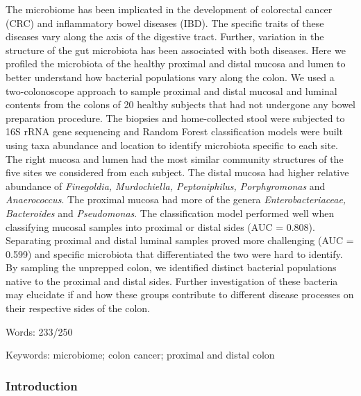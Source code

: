 \documentclass[12pt,]{article}
\begin{document}
The microbiome has been implicated in the development of colorectal
cancer (CRC) and inflammatory bowel diseases (IBD). The specific traits
of these diseases vary along the axis of the digestive tract. Further,
variation in the structure of the gut microbiota has been associated
with both diseases. Here we profiled the microbiota of the healthy
proximal and distal mucosa and lumen to better understand how bacterial
populations vary along the colon. We used a two-colonoscope approach to
sample proximal and distal mucosal and luminal contents from the colons
of 20 healthy subjects that had not undergone any bowel preparation
procedure. The biopsies and home-collected stool were subjected to 16S
rRNA gene sequencing and Random Forest classification models were built
using taxa abundance and location to identify microbiota specific to
each site. The right mucosa and lumen had the most similar community
structures of the five sites we considered from each subject. The distal
mucosa had higher relative abundance of \emph{Finegoldia, Murdochiella,
Peptoniphilus, Porphyromonas} and \emph{Anaerococcus}. The proximal
mucosa had more of the genera \emph{Enterobacteriaceae, Bacteroides} and
\emph{Pseudomonas}. The classification model performed well when
classifying mucosal samples into proximal or distal sides (AUC = 0.808).
Separating proximal and distal luminal samples proved more challenging
(AUC = 0.599) and specific microbiota that differentiated the two were
hard to identify. By sampling the unprepped colon, we identified
distinct bacterial populations native to the proximal and distal sides.
Further investigation of these bacteria may elucidate if and how these
groups contribute to different disease processes on their respective
sides of the colon.

Words: 233/250

Keywords: microbiome; colon cancer; proximal and distal colon

\subsubsection{Introduction}\label{introduction}
\end{document}
